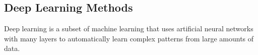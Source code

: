 


\subsection{Deep Learning Methods}
Deep learning is a subset of machine learning that uses artificial neural networks with many layers to automatically learn complex patterns from large amounts of data.









